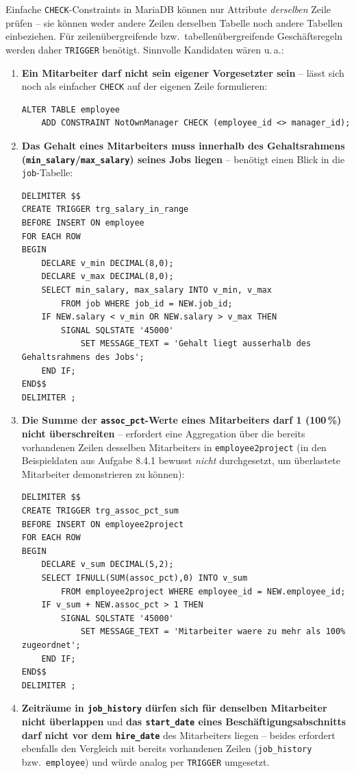 \documentclass[11pt,a4paper]{article}
\begin{document}
\begin{loesung}
Einfache \texttt{CHECK}-Constraints in MariaDB k\"onnen nur Attribute \emph{derselben} Zeile pr\"ufen -- sie k\"onnen weder andere Zeilen derselben Tabelle noch andere Tabellen einbeziehen. F\"ur zeilen\"ubergreifende bzw.\ tabellen\"ubergreifende Gesch\"aftsregeln werden daher \texttt{TRIGGER} ben\"otigt. Sinnvolle Kandidaten w\"aren u.\,a.:

\begin{enumerate}
\item \textbf{Ein Mitarbeiter darf nicht sein eigener Vorgesetzter sein} -- l\"asst sich noch als einfacher \texttt{CHECK} auf der eigenen Zeile formulieren:
\begin{lstlisting}
ALTER TABLE employee
    ADD CONSTRAINT NotOwnManager CHECK (employee_id <> manager_id);
\end{lstlisting}
\item \textbf{Das Gehalt eines Mitarbeiters muss innerhalb des Gehaltsrahmens (\texttt{min\_salary}/\texttt{max\_salary}) seines Jobs liegen} -- ben\"otigt einen Blick in die \texttt{job}-Tabelle:
\begin{lstlisting}
DELIMITER $$
CREATE TRIGGER trg_salary_in_range
BEFORE INSERT ON employee
FOR EACH ROW
BEGIN
    DECLARE v_min DECIMAL(8,0);
    DECLARE v_max DECIMAL(8,0);
    SELECT min_salary, max_salary INTO v_min, v_max
        FROM job WHERE job_id = NEW.job_id;
    IF NEW.salary < v_min OR NEW.salary > v_max THEN
        SIGNAL SQLSTATE '45000'
            SET MESSAGE_TEXT = 'Gehalt liegt ausserhalb des Gehaltsrahmens des Jobs';
    END IF;
END$$
DELIMITER ;
\end{lstlisting}
\item \textbf{Die Summe der \texttt{assoc\_pct}-Werte eines Mitarbeiters darf 1 (100\,\%) nicht \"uberschreiten} -- erfordert eine Aggregation \"uber die bereits vorhandenen Zeilen desselben Mitarbeiters in \texttt{employee2project} (in den Beispieldaten aus Aufgabe 8.4.1 bewusst \emph{nicht} durchgesetzt, um \"uberlastete Mitarbeiter demonstrieren zu k\"onnen):
\begin{lstlisting}
DELIMITER $$
CREATE TRIGGER trg_assoc_pct_sum
BEFORE INSERT ON employee2project
FOR EACH ROW
BEGIN
    DECLARE v_sum DECIMAL(5,2);
    SELECT IFNULL(SUM(assoc_pct),0) INTO v_sum
        FROM employee2project WHERE employee_id = NEW.employee_id;
    IF v_sum + NEW.assoc_pct > 1 THEN
        SIGNAL SQLSTATE '45000'
            SET MESSAGE_TEXT = 'Mitarbeiter waere zu mehr als 100% zugeordnet';
    END IF;
END$$
DELIMITER ;
\end{lstlisting}
\item \textbf{Zeitr\"aume in \texttt{job\_history} d\"urfen sich f\"ur denselben Mitarbeiter nicht \"uberlappen} und \textbf{das \texttt{start\_date} eines Besch\"aftigungsabschnitts darf nicht vor dem \texttt{hire\_date}} des Mitarbeiters liegen -- beides erfordert ebenfalls den Vergleich mit bereits vorhandenen Zeilen (\texttt{job\_history} bzw.\ \texttt{employee}) und w\"urde analog per \texttt{TRIGGER} umgesetzt.
\end{enumerate}
\end{loesung}
\end{document}
